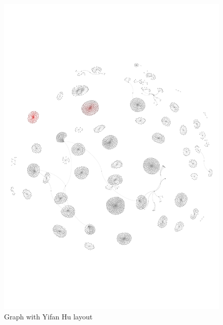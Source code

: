 \begin{figure}
	 \begin{center}
		\includegraphics[scale=0.8]{q3/A4_q3_without_labels.pdf}
		\caption{Graph with Yifan Hu layout}
		\label{fig:q3-2}
 	\end{center}
\end{figure}
